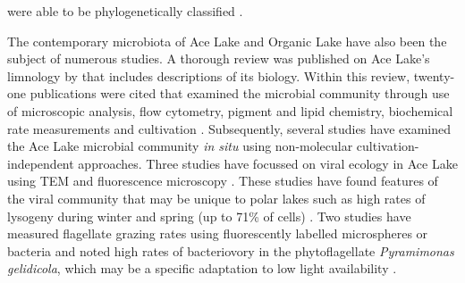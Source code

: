 were able to be phylogenetically classified \cite{Coolen2004a, Coolen2004b, Coolen2006, Coolen2008}.

The contemporary microbiota of Ace Lake and Organic Lake have also been the subject of numerous studies.
A thorough review was published on Ace Lake's limnology by \citet{Rankin1999} that includes descriptions of its biology.
Within this review, twenty-one publications were cited that examined the microbial community through use of microscopic analysis, flow cytometry, pigment and lipid chemistry, biochemical rate measurements and cultivation \cite{Rankin1999}.
Subsequently, several studies have examined the Ace Lake microbial community \emph{in situ} using non-molecular cultivation-independent approaches.
Three studies have focussed on viral ecology in Ace Lake using \ac{TEM} and fluorescence microscopy \cite{Laybourn-Parry2001, Madan2005, Laybourn-Parry2007}.
These studies have found features of the viral community that may be unique to polar lakes such as high rates of lysogeny during winter and spring (up to 71\% of cells) \cite{Laybourn-Parry2007}.
Two studies have measured flagellate grazing rates using fluorescently labelled microspheres or bacteria and noted high rates of bacteriovory in the phytoflagellate \emph{Pyramimonas gelidicola}, which may be a specific adaptation to low light availability \cite{Bell2003, Laybourn-Parry2005}.

